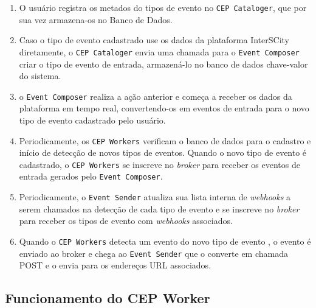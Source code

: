 \begin{enumerate}
    \item O usuário registra os metados do tipos de evento no \texttt{CEP Cataloger}, que por sua vez armazena-os no Banco de Dados.
    \item Caso o tipo de evento cadastrado use os dados da plataforma InterSCity diretamente, o \texttt{CEP Cataloger} envia uma chamada para o \texttt{Event Composer} criar o tipo de evento de entrada, armazená-lo no banco de dados chave-valor do sistema.
    \item o \texttt{Event Composer} realiza a ação anterior e começa a receber os dados da plataforma em tempo real, convertendo-os em eventos de entrada para o novo tipo de evento cadastrado pelo usuário.
    \item Periodicamente, os \texttt{CEP Workers} verificam o banco de dados para o cadastro e início de detecção de novos tipos de eventos. Quando o novo tipo de evento é cadastrado, o \texttt{CEP Workers} se inscreve no \textit{broker} para receber os eventos de entrada gerados pelo \texttt{Event Composer}.
    \item Periodicamente, o \texttt{Event Sender} atualiza sua lista interna de \textit{webhooks} a serem chamados na detecção de cada tipo de evento e se inscreve no \textit{broker} para receber os tipos de evento com \textit{webhooks} associados.
    \item Quando o \texttt{CEP Workers} detecta um evento do novo tipo de evento , o evento é enviado ao broker e chega ao \texttt{Event Sender} que o converte em chamada POST e o envia para os endereços URL associados.
\end{enumerate}





\subsection{Funcionamento do CEP Worker}
\label{sub-sec:cep-worker-func}

